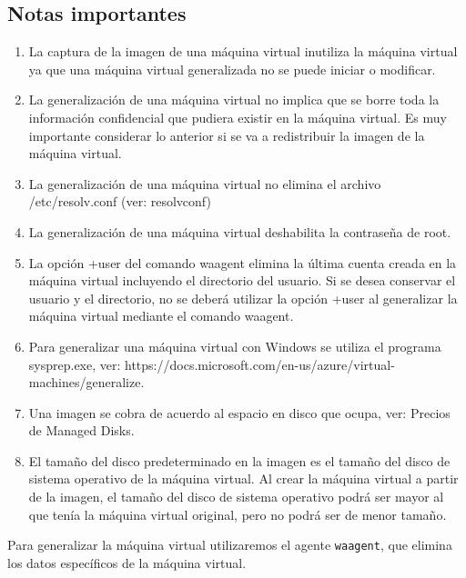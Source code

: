 \documentclass[11pt,a4paper,oneside]{book}
\begin{document}
\subsection{Notas importantes}

\begin{enumerate}

\item La captura de la imagen de una máquina virtual inutiliza la máquina virtual ya que una máquina virtual generalizada no se puede iniciar o modificar.

\item La generalización de una máquina virtual no implica que se borre toda la información confidencial que pudiera existir en la máquina virtual. Es muy importante considerar lo anterior si se va a redistribuir la imagen de la máquina virtual.

\item La generalización de una máquina virtual no elimina el archivo /etc/resolv.conf (ver: resolvconf)

\item La generalización de una máquina virtual deshabilita la contraseña de root.

\item La opción +user del comando waagent elimina la última cuenta creada en la máquina virtual incluyendo el directorio del usuario. Si se desea conservar el usuario y el directorio, no se deberá utilizar la opción +user al generalizar la máquina virtual mediante el comando waagent.

\item Para generalizar una máquina virtual con Windows se utiliza el programa sysprep.exe, ver: https://docs.microsoft.com/en-us/azure/virtual-machines/generalize.

\item Una imagen se cobra de acuerdo al espacio en disco que ocupa, ver: Precios de Managed Disks.

\item El tamaño del disco predeterminado en la imagen es el tamaño del disco de sistema operativo de la máquina virtual. Al crear la máquina virtual a partir de la imagen, el tamaño del disco de sistema operativo podrá ser mayor al que tenía la máquina virtual original, pero no podrá ser de menor tamaño.

\end{enumerate}

Para generalizar la máquina virtual utilizaremos el agente \texttt{waagent}, que elimina los datos específicos de la máquina virtual.
\end{document}
